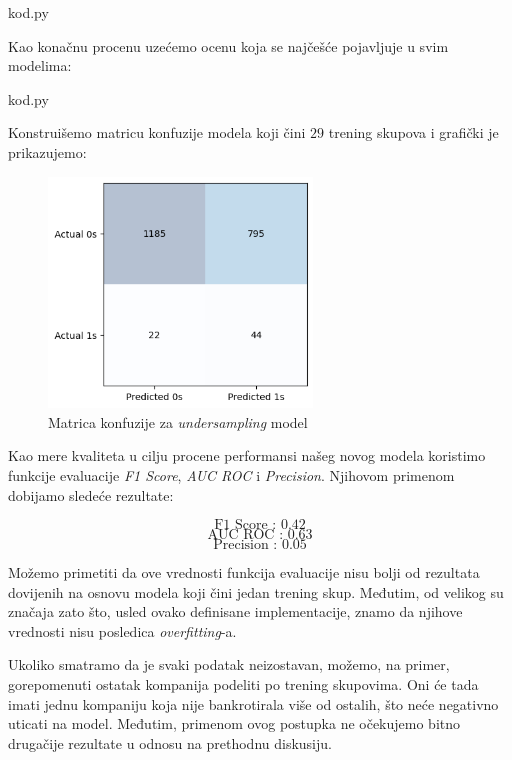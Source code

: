 \documentclass[12pt]{article}
\theoremstyle{definition}
\theoremstyle{remark}
\begin{document}
\hfill

{kod.py}

\hfill

Kao konačnu procenu uzećemo ocenu koja se najčešće pojavljuje u svim modelima:

\hfill

{kod.py}

\hfill

Konstruišemo matricu konfuzije modela koji čini $29$ trening skupova i grafički je prikazujemo:

\begin{figure}[htp]
    \centering
    \includegraphics[width=7cm]{output_20_0.png}
    \caption{Matrica konfuzije za \emph{undersampling} model}
    \label{fig:galaxy}
\end{figure}

Kao mere kvaliteta u cilju procene performansi našeg novog modela koristimo funkcije evaluacije  \emph{F1 Score}, \emph{AUC ROC} i \emph{Precision}. Njihovom primenom dobijamo sledeće rezultate:

\hfill

$$
\text{F1 Score : 0.42}
$$
$$
\text{AUC ROC : 0.63}
$$
$$
\text{Precision : 0.05}
$$
\hfill

Možemo primetiti da ove vrednosti funkcija evaluacije nisu bolji od rezultata dovijenih na osnovu modela koji čini jedan trening skup. Međutim, od velikog su značaja zato što, usled ovako definisane implementacije, znamo da njihove vrednosti nisu posledica \emph{overfitting}-a.


Ukoliko smatramo da je svaki podatak neizostavan, možemo, na primer, gorepomenuti ostatak kompanija podeliti po trening skupovima. Oni će tada imati jednu kompaniju koja nije bankrotirala više od ostalih, što neće negativno uticati na model. Međutim, primenom ovog postupka ne očekujemo bitno drugačije rezultate u odnosu na prethodnu diskusiju.
\end{document}
